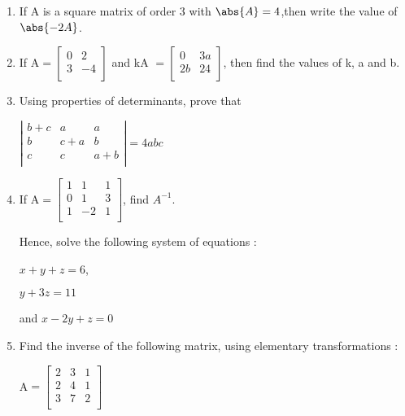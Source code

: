 
\begin{enumerate}

\item If A is a square matrix of order 3 with  $\abs{A}=4$,then write the value of $\abs{-2A}$.
    \item If A$=\begin{bmatrix}
        0 & 2\\
        3 & -4\\
    \end{bmatrix}$ and kA $=\begin{bmatrix}
        0 & 3a\\
        2b & 24\\
    \end{bmatrix}$, then find the values of k, a and b.
     
    \item Using properties of determinants, prove that
    
    \hspace{2cm}
   $ \left|
         \begin{matrix}
        b+c & a & a\\
        b & c+a & b\\
        c & c & a+b\\
    \end{matrix} 
    \right|=4abc$
    \item If A$=\begin{bmatrix}
        1 & 1 & 1\\
        0 & 1 & 3\\
        1 & -2 & 1\\
    \end{bmatrix}$, find $A^{-1}.$

    Hence, solve the following system of equations :

    \hspace{1cm} $ x + y + z=6 $,

    \hspace{1cm} $y + 3z = 11 $

    \hspace{0.3cm} and  $x -2y + z = 0$

    \item Find  the  inverse  of  the following  matrix,  using  elementary 
transformations :

\hspace{1.5cm}A$=\begin{bmatrix}
        2 & 3 & 1\\
        2 & 4 & 1\\
        3 & 7 & 2\\
    \end{bmatrix}$

 \end{enumerate}
 
